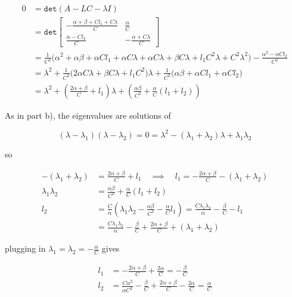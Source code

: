 \documentclass[11pt]{article}
\theoremstyle{definition}
\begin{document}
\begin{enumerate}
\begin{enumerate}
        \begin{align*}
            0 &= \mathtt{det}(A - LC - \lambda I) \\
            &= \mathtt{det}
            \begin{bmatrix}
                -\frac{\alpha + \beta + Cl_1 + C \lambda}{C} & \frac{\alpha}{C} \\
                \frac{\alpha - Cl_2}{C} & - \frac{\alpha + C\lambda}{C}
            \end{bmatrix} \\
            &= \frac{1}{C^2} \big( \alpha^2 + \alpha\beta + \alpha C l_1 + \alpha C \lambda + \alpha C \lambda + \beta C \lambda + l_1 C^2 \lambda + C^2 \lambda^2 \big) - \frac{\alpha^2 - \alpha C l_2}{C^2} \\
            &= \lambda^2 + \frac{1}{C^2}\big( 2 \alpha C \lambda + \beta C \lambda + l_1 C^2 \big) \lambda  + \frac{1}{C^2}\big(\alpha\beta + \alpha C l_1 + \alpha C l_2) \\
            &= \lambda^2 + \left( \frac{2\alpha + \beta}{C} + l_1 \right) \lambda + \left( \frac{\alpha\beta}{C^2} + \frac{\alpha}{C}(l_1 + l_2) \right)
        \end{align*}

        As in part b), the eigenvalues are solutions of

        $$ (\lambda - \lambda_1)(\lambda - \lambda_2) = 0 = \lambda^2 - (\lambda_1 + \lambda_2) \lambda + \lambda_1 \lambda_2 $$

        so 

        \begin{align*}
            -(\lambda_1 + \lambda_2) &= \frac{2\alpha + \beta}{C} + l_1 \quad \implies \quad l_1 = -\frac{2\alpha + \beta}{C} - (\lambda_1 + \lambda_2) \\
            \lambda_1 \lambda_2 &= \frac{\alpha\beta}{C^2} + \frac{\alpha}{C}(l_1 + l_2) \\
            l_2 &= \frac{C}{\alpha} \left(  \lambda_1 \lambda_2 - \frac{\alpha \beta}{C^2} - \frac{\alpha}{C} l_1 \right) = \frac{C \lambda_1 \lambda_2}{\alpha} - \frac{\beta}{C} - l_1 \\
            &= \frac{C \lambda_1 \lambda_2}{\alpha} - \frac{\beta}{C} + \frac{2\alpha + \beta}{C} + (\lambda_1 + \lambda_2)
        \end{align*}

        plugging in $\lambda_1 = \lambda_2 = - \frac{\alpha}{C}$ gives

        \begin{align*}
            l_1 &= -\frac{2\alpha + \beta}{C} + \frac{2\alpha}{C} = -\frac{\beta}{C} \\
            l_2 &= \frac{C \alpha^2}{\alpha C^2} - \frac{\beta}{C} + \frac{2\alpha + \beta}{C} - \frac{2\alpha}{C} = \frac{\alpha}{C}
        \end{align*}


\end{enumerate}
\end{enumerate}
\end{document}
